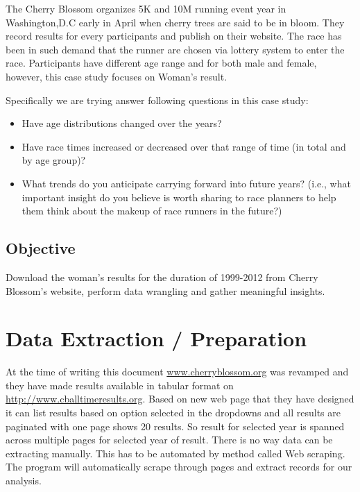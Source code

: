 \documentclass[
]{article}
\providecommand{\tightlist}{%
  \setlength{\itemsep}{0pt}\setlength{\parskip}{0pt}}
\begin{document}
The Cherry Blossom organizes 5K and 10M running event year in
Washington,D.C early in April when cherry trees are said to be in bloom.
They record results for every participants and publish on their website.
The race has been in such demand that the runner are chosen via lottery
system to enter the race. Participants have different age range and for
both male and female, however, this case study focuses on Woman's
result.

Specifically we are trying answer following questions in this case
study:

\begin{itemize}
\tightlist
\item
  Have age distributions changed over the years?
\item
  Have race times increased or decreased over that range of time (in
  total and by age group)?
\item
  What trends do you anticipate carrying forward into future years?
  (i.e., what important insight do you believe is worth sharing to race
  planners to help them think about the makeup of race runners in the
  future?)
\end{itemize}

\hypertarget{objective}{%
\subsection{Objective}\label{objective}}

Download the woman's results for the duration of 1999-2012 from Cherry
Blossom's website, perform data wrangling and gather meaningful
insights.

\newpage

\hypertarget{data-extraction-preparation}{%
\section{Data Extraction /
Preparation}\label{data-extraction-preparation}}

At the time of writing this document
\href{http://www.cherryblossom.org/}{www.cherryblossom.org} was revamped
and they have made results available in tabular format on
\href{http://www.cballtimeresults.org/performances}{http://www.cballtimeresults.org}.
Based on new web page that they have designed it can list results based
on option selected in the dropdowns and all results are paginated with
one page shows 20 results. So result for selected year is spanned across
multiple pages for selected year of result. There is no way data can be
extracting manually. This has to be automated by method called Web
scraping. The program will automatically scrape through pages and
extract records for our analysis.
\end{document}
